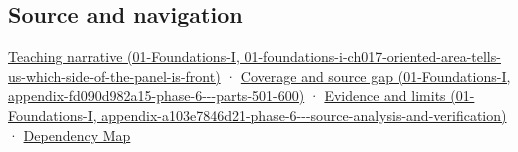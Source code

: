 \subsection{Source and navigation}\label{appendix-87d7626c8d37-source-and-navigation}

\href{../01-Foundations-I/main.pdf\#nameddest=01-foundations-i-ch017-oriented-area-tells-us-which-side-of-the-panel-is-front}{Teaching narrative (01-Foundations-I, 01-foundations-i-ch017-oriented-area-tells-us-which-side-of-the-panel-is-front)} · \href{../01-Foundations-I/main.pdf\#nameddest=appendix-fd090d982a15-phase-6---parts-501-600}{Coverage and source gap (01-Foundations-I, appendix-fd090d982a15-phase-6-\/-\/-parts-501-600)} · \href{../01-Foundations-I/main.pdf\#nameddest=appendix-a103e7846d21-phase-6---source-analysis-and-verification}{Evidence and limits (01-Foundations-I, appendix-a103e7846d21-phase-6-\/-\/-source-analysis-and-verification)} · \hyperref[appendix-4ad47bdd269a]{Dependency Map}
